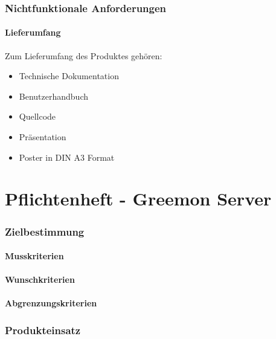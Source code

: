 \documentclass[pointlessnumbers]{scrartcl}
\begin{document}
\section{Nichtfunktionale Anforderungen}
%
%

\subsection{Lieferumfang}
Zum Lieferumfang des Produktes gehören:
\begin{itemize}
    \item Technische Dokumentation
    \item Benutzerhandbuch
    \item Quellcode
    \item Präsentation
    \item Poster in DIN A3 Format 
\end{itemize}

%
%
%
%

\newpage
\part{Pflichtenheft - Greemon Server}
\newpage

\section{Zielbestimmung}
\subsection{Musskriterien}
%
%
\subsection{Wunschkriterien}
%
%
\subsection{Abgrenzungskriterien}
%
%

\section{Produkteinsatz}
\end{document}
